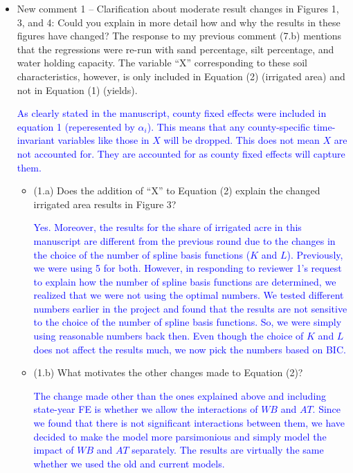 \documentclass[
]{article}
\begin{document}
\begin{itemize}
\item New comment 1 – Clarification about moderate result changes in Figures 1, 3, and 4: Could you explain in more detail how and why the results in these figures have changed? The response to my previous comment (7.b) mentions that the regressions were re-run with sand percentage, silt percentage, and water holding capacity. The variable ``X'' corresponding to these soil characteristics, however, is only included in Equation (2) (irrigated area) and not in Equation (1) (yields).

  \textcolor{blue}{As clearly stated in the manuscript, county fixed effects were included in equation 1 (reperesented by $\alpha_i$). This means that any county-specific time-invariant variables like those in $X$ will be dropped. This does not mean $X$ are not accounted for. They are accounted for as county fixed effects will capture them.}

  \begin{itemize}
  \item (1.a) Does the addition of ``X'' to Equation (2) explain the changed irrigated area results in Figure 3?

  \textcolor{blue}{Yes. Moreover, the results for the share of irrigated acre in this manuscript are different from the previous round due to the changes in the choice of the number of spline basis functions ($K$ and $L$). Previously, we were using 5 for both. However, in responding to reviewer 1's request to explain how the number of spline basis functions are determined, we realized that we were not using the optimal numbers. We tested different numbers earlier in the project and found that the results are not sensitive to the choice of the number of spline basis functions. So, we were simply using reasonable numbers back then. Even though the choice of $K$ and $L$ does not affect the results much, we now pick the numbers based on BIC.}
  
  \item (1.b) What motivates the other changes made to Equation (2)?

  \textcolor{blue}{The change made other than the ones explained above and including state-year FE is whether we allow the interactions of $WB$ and $AT$. Since we found that there is not significant interactions between them, we have decided to make the model more parsimonious and simply model the impact of $WB$ and $AT$ separately. The results are virtually the same whether we used the old and current models.}
  

\end{itemize}
\end{itemize}
\end{document}
